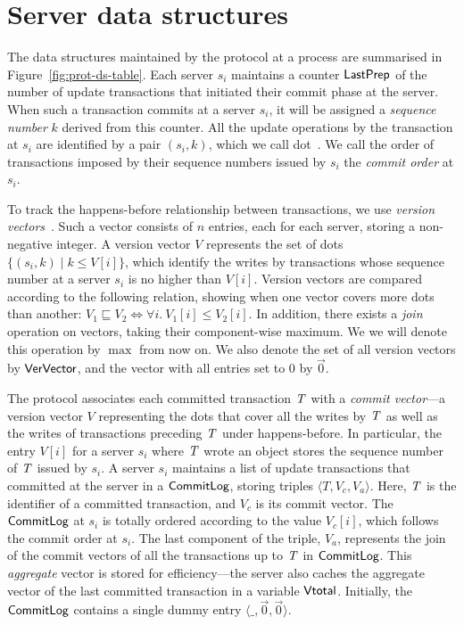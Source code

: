 \section{Server data structures}

The data structures maintained by the protocol at a process are summarised in Figure~\ref{fig:prot-ds-table}. Each server $s_i$ maintains a counter $\mathsf{LastPrep}$ of the number of update transactions that initiated their commit phase at the server. When such a transaction commits at a server $s_i$, it will be assigned a \emph{sequence number} $k$ derived from this counter. All the update operations by the transaction at $s_i$ are identified by a pair $(s_i, k)$, which we call dot~\citep{carlos-causality}. We call the order of transactions imposed by their sequence numbers issued by $s_i$ the \emph{commit order} at $s_i$.

To track the happens-before relationship between transactions, we use \emph{version vectors}~\citep{version-vectors}. Such a vector consists of $n$ entries, each for each server, storing a non-negative integer. A version vector $V$ represents the set of dots $\{(s_i, k) \mid k \le V[i]\}$, which identify the writes by transactions whose sequence number at a server $s_i$ is no higher than $V[i]$. Version vectors are compared according to the following relation, showing when one vector covers more dots than another: $V_1 \sqsubseteq V_2 \iff \forall i.\ V_1[i] \le V_2[i]$. In addition, there exists a \emph{join} operation on vectors, taking their component-wise maximum. We we will denote this operation by $\max$ from now on. We also denote the set of all version vectors by $\mathsf{VerVector}$, and the vector with all entries set to $0$ by $\vec{0}$.

The protocol associates each committed transaction $\mathit{T}$ with a \emph{commit vector}---a version vector $V$ representing the dots that cover all the writes by $\mathit{T}$ as well as the writes of transactions preceding $\mathit{T}$ under happens-before. In particular, the entry $V[i]$ for a server $s_i$ where $\mathit{T}$ wrote an object stores the sequence number of $\mathit{T}$ issued by $s_i$. A server $s_i$ maintains a list of update transactions that committed at the server in a $\mathsf{CommitLog}$, storing triples $\langle T,V_c,V_a\rangle$. Here, $\mathit{T}$ is the identifier of a committed transaction, and $V_c$ is its commit vector. The $\mathsf{CommitLog}$ at $s_i$ is totally ordered according to the value $V_c[i]$, which follows the commit order at $s_i$. The last component of the triple, $V_a$, represents the join of the commit vectors of all the transactions up to $\mathit{T}$ in $\mathsf{CommitLog}$. This \emph{aggregate} vector is stored for efficiency---the server also caches the aggregate vector of the last committed transaction in a variable $\mathsf{Vtotal}$. Initially, the $\mathsf{CommitLog}$ contains a single dummy entry $\langle \_, \vec{0}, \vec{0} \rangle$.

